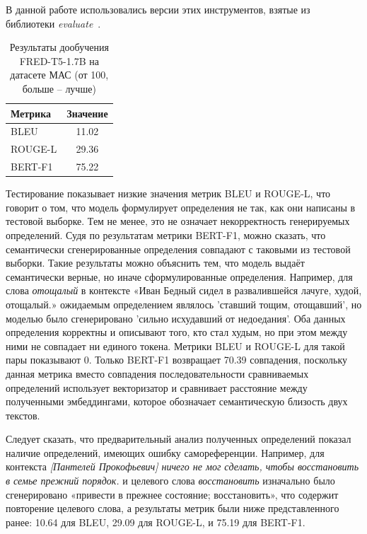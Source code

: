 \documentclass[LI,VKR]{HSEUniversity}
\begin{document}
В данной работе использовались версии этих инструментов, взятые из библиотеки \textit{evaluate}~.

\begin{table}[H]
\centering
\caption{Результаты дообучения FRED-T5-1.7B на датасете МАС (от 100, больше – лучше)}
\begin{tabular}{|l|c|}
\hline
Метрика                  & Значение \\
\hline
BLEU            & 11.02                  \\
\hline
ROUGE-L           & 29.36                  \\
\hline
BERT-F1          & 75.22                  \\
\hline
\end{tabular}
\end{table}

Тестирование показывает низкие значения метрик BLEU и ROUGE-L,
что говорит о том, что модель формулирует определения не так,
как они написаны в тестовой выборке.
Тем не менее, это не означает некорректность генерируемых определений.
Судя по результатам метрики BERT-F1, можно сказать, что семантически сгенерированные определения
совпадают с таковыми из тестовой выборки.
Такие результаты можно объяснить тем, что модель выдаёт семантически верные,
но иначе сформулированные определения.
Например, для слова \textit{отощалый} в контексте
«Иван Бедный сидел в развалившейся лачуге, худой, отощалый.»
ожидаемым определением являлось ’ставший тощим, отощавший’,
но моделью было сгенерировано ’сильно исхудавший от недоедания’.
Оба данных определения корректны и описывают того, кто стал худым,
но при этом между ними не совпадает ни единого токена.
Метрики BLEU и ROUGE-L для такой пары показывают 0.
Только BERT-F1 возвращает 70.39 совпадения,
поскольку данная метрика вместо совпадения последовательности сравниваемых определений
использует векторизатор и сравнивает расстояние между полученными эмбеддингами,
которое обозначает семантическую близость двух текстов.

Следует сказать, что предварительный анализ полученных определений показал
наличие определений, имеющих ошибку самореференции.
Например, для контекста \textit{[Пантелей Прокофьевич] ничего не мог сделать, чтобы восстановить в семье прежний порядок.}
и целевого слова \textit{восстановить}
изначально было сгенерировано «привести в прежнее состояние; восстановить»,
что содержит повторение целевого слова,
а результаты метрик были ниже представленного ранее: 10.64 для BLEU, 29.09 для ROUGE-L, и 75.19 для BERT-F1.
\end{document}
